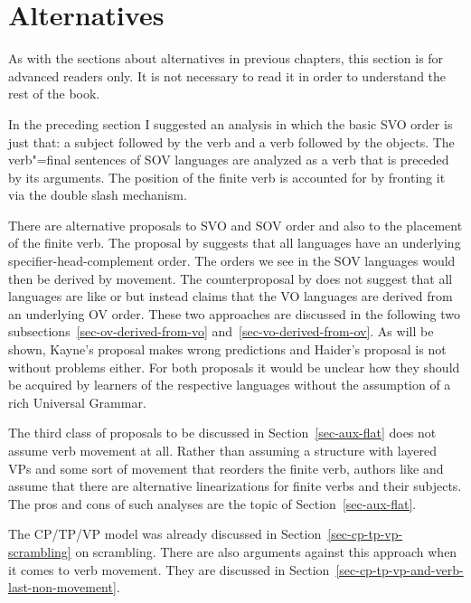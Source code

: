 \section{Alternatives}

As with the sections about alternatives in previous chapters, this section is for advanced readers
only. It is not necessary to read it in order to understand the rest of the book.

In the preceding section I suggested an analysis in which the basic SVO order is just that: a
subject followed by the verb and a verb followed by the objects. The verb"=final sentences of SOV
languages are analyzed as a verb that is preceded by its arguments. The position of the finite verb
is accounted for by fronting it via the double slash mechanism.

\largerpage[1]
There are alternative proposals to SVO and SOV order and also to the placement of the finite
verb. The proposal by \citet{Kayne94a-u} suggests that all languages have an underlying
specifier-head-complement order. The orders we see in the  SOV languages would then be
derived by movement. The counterproposal by \citet{Haider2000a,Haider2020a} does not suggest that all languages are
like  or  but instead claims that the VO languages are derived from an underlying OV
order. These two approaches are discussed in the following two subsections~\ref{sec-ov-derived-from-vo} and~\ref{sec-vo-derived-from-ov}. As will be shown,
Kayne's proposal\pagebreak{} makes wrong predictions and Haider's proposal is not without problems either. For
both proposals it would be unclear how they should be acquired by learners of the respective
languages without the assumption of a rich Universal Grammar.

The third class of proposals to be discussed in Section~\ref{sec-aux-flat} does not assume verb movement at
all. Rather than assuming a structure with layered VPs and some sort of movement that reorders the
finite verb, authors like \citet*{GKPS85a} and \citet{Sag2020a} assume that there are alternative
linearizations for finite verbs and their subjects. The pros and cons of such analyses are the topic
of Section~\ref{sec-aux-flat}.

The CP/TP/VP model was already discussed in Section~\ref{sec-cp-tp-vp-scrambling} on scrambling. 
There are also arguments against this approach when it comes to verb movement. They are discussed in
Section~\ref{sec-cp-tp-vp-and-verb-last-non-movement}.  

